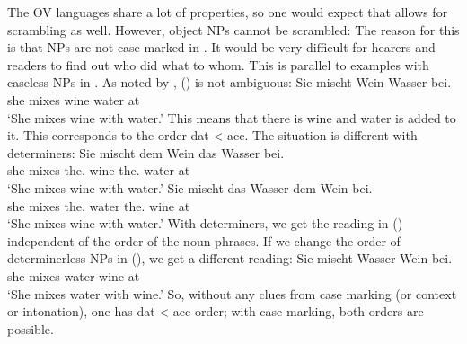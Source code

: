 The OV languages share a lot of properties, so one would expect that  allows for scrambling as
well. However, object NPs cannot be scrambled:
\z
The reason for this is that NPs are not case marked in . It would be very difficult for hearers
and readers to find out who did what to whom. This is parallel to examples with caseless NPs in
. As noted by \citet[]{Wegener85b}, () is not ambiguous:
\ea
\label{ex-sie-mischt-dem-wein-wasser-bei}
\gll Sie mischt Wein Wasser bei.\\
     she mixes  wine water  at\\\german
\glt `She mixes wine with water.'
\z
This means that there is wine and water is added to it. This corresponds to the order dat < acc.
The situation is different with determiners:
\eal
\ex 
\gll Sie mischt dem Wein das Wasser bei.\\
     she mixes  the.\DAT{} wine the.\ACC{} water at\\\german
\glt `She mixes wine with water.'
\ex 
\gll Sie mischt das        Wasser dem        Wein bei.\\
     she mixes  the.\ACC{} water  the.\DAT{} wine at\\
\glt `She mixes wine with water.'
\zl
With determiners, we get the reading in () independent of the order of the noun phrases. If
we change the order of determinerless NPs in (), we get a different reading:
\ea
\gll Sie mischt Wasser Wein bei.\\
     she mixes  water wine  at\\\german
\glt `She mixes water with wine.'
\z
So, without any clues from case marking (or context or intonation), one has dat < acc order; with
case marking, both orders are possible.
%
%
%
%
%

